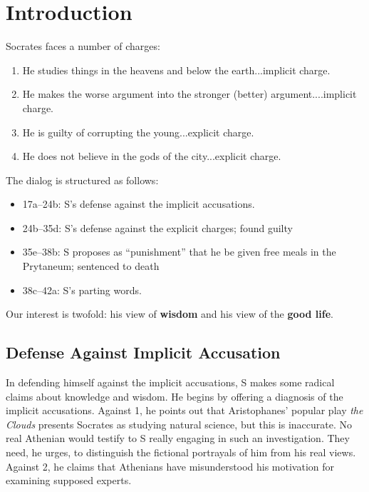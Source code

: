 \documentclass[oneside]{article}
\begin{document}
\thispagestyle{fancy}

\section*{Introduction}

Socrates faces a number of charges:

\begin{enumerate}
\item He studies things in the heavens and below the earth...implicit charge.
\item He makes the worse argument into the stronger (better) argument....implicit charge.
\item He is guilty of corrupting the young...explicit charge.
\item He does not believe in the gods of the city...explicit charge.
\end{enumerate}
The dialog is structured as follows: 

\begin{itemize}
\item 17a--24b: S's defense against the implicit accusations. 
\item 24b--35d: S's defense against the explicit charges; found guilty

\item  35e--38b: S proposes as ``punishment'' that he be given free meals in the Prytaneum; sentenced to death
\item 38c--42a: S's parting words.
\end{itemize}
Our interest is twofold: his  view of \textbf{wisdom} and his view of the \textbf{good life}. 

\subsection*{Defense Against Implicit Accusation}
In defending himself against the implicit  accusations, S makes some radical claims about knowledge and wisdom. He begins by  offering a diagnosis of the implicit accusations. Against 1, he points out that Aristophanes' popular play \emph{the Clouds} presents Socrates as studying natural science, but this is inaccurate. No real Athenian would testify to S really engaging in such an investigation. They need, he urges, to distinguish the fictional portrayals of him from his real views. Against 2, he claims that Athenians have misunderstood his motivation for examining supposed experts. 
\end{document}
